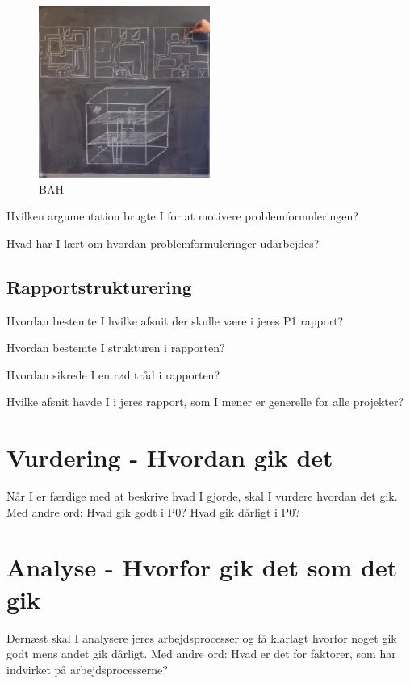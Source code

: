 \documentclass[a4paper,12pt,twoside,openright]{memoir}
\begin{document}
        \begin{figure}[ht!]
            \centering
            \includegraphics[width=0.5\textwidth]{Images/6.jpg}
            \caption{BAH}
            \label{4}
        \end{figure}

Hvilken argumentation brugte I for at motivere problemformuleringen?
        
Hvad har I lært om hvordan problemformuleringer udarbejdes?

        \subsection{Rapportstrukturering}

Hvordan bestemte I hvilke afsnit der skulle være i jeres P1 rapport?

Hvordan bestemte I strukturen i rapporten?

Hvordan sikrede I en rød tråd i rapporten?

Hvilke afsnit havde I i jeres rapport, som I mener er generelle for alle projekter?

    \section{Vurdering - Hvordan gik det}

Når I er færdige med at beskrive hvad I gjorde, skal I vurdere hvordan det gik. Med andre ord: Hvad gik godt i P0? Hvad gik dårligt i P0? 

    \section{Analyse - Hvorfor gik det som det gik}

Dernæst skal I analysere jeres arbejdsprocesser og få klarlagt hvorfor noget gik godt mens andet gik dårligt. Med andre ord: Hvad er det for faktorer, som har indvirket på arbejdsprocesserne? 
\end{document}
